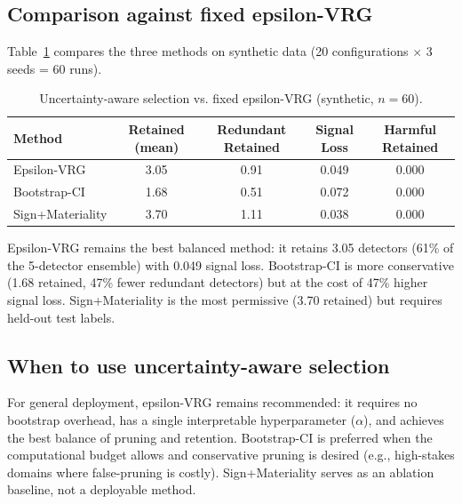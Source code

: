 \subsection{Comparison against fixed epsilon-VRG}

Table~\ref{tab:phase4_comparison} compares the three methods on synthetic data (20 configurations $\times$ 3 seeds = 60 runs).

\begin{table}[h]
\centering
\caption{Uncertainty-aware selection vs. fixed epsilon-VRG (synthetic, $n=60$).}
\label{tab:phase4_comparison}
\begin{tabular}{lcccc}
\toprule
Method & Retained (mean) & Redundant Retained & Signal Loss & Harmful Retained \\
\midrule
Epsilon-VRG & 3.05 & 0.91 & 0.049 & 0.000 \\
Bootstrap-CI & 1.68 & 0.51 & 0.072 & 0.000 \\
Sign+Materiality & 3.70 & 1.11 & 0.038 & 0.000 \\
\bottomrule
\end{tabular}
\end{table}

Epsilon-VRG remains the best balanced method: it retains 3.05 detectors (61\% of the 5-detector ensemble) with 0.049 signal loss. Bootstrap-CI is more conservative (1.68 retained, 47\% fewer redundant detectors) but at the cost of 47\% higher signal loss. Sign+Materiality is the most permissive (3.70 retained) but requires held-out test labels.

\subsection{When to use uncertainty-aware selection}

For general deployment, epsilon-VRG remains recommended: it requires no bootstrap overhead, has a single interpretable hyperparameter ($\alpha$), and achieves the best balance of pruning and retention. Bootstrap-CI is preferred when the computational budget allows and conservative pruning is desired (e.g., high-stakes domains where false-pruning is costly). Sign+Materiality serves as an ablation baseline, not a deployable method.
